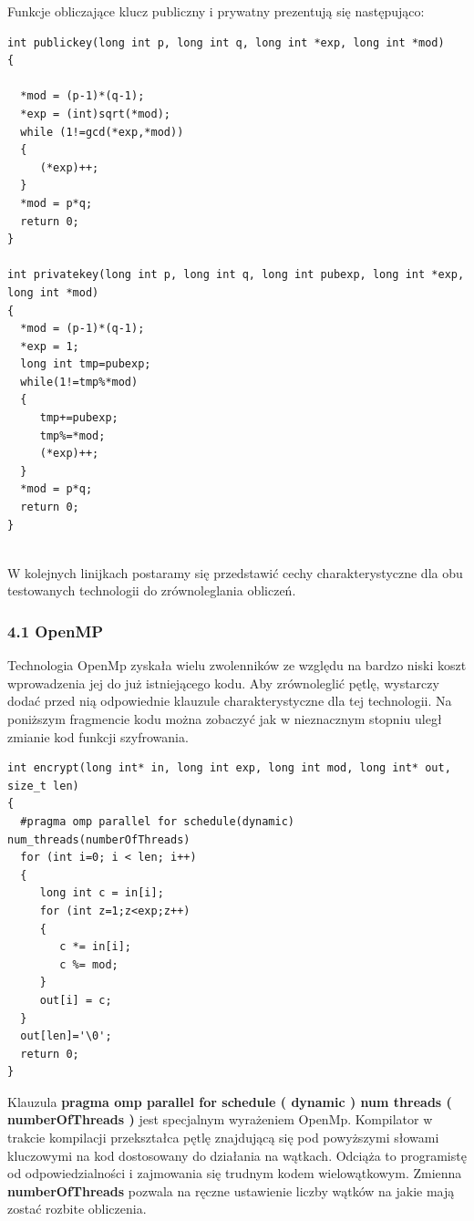 \documentclass[a4paper,12pt]{article}
\begin{document}
Funkcje obliczające klucz publiczny i prywatny prezentują się następująco:
\begin{lstlisting}
int publickey(long int p, long int q, long int *exp, long int *mod)
{

  *mod = (p-1)*(q-1);
  *exp = (int)sqrt(*mod);
  while (1!=gcd(*exp,*mod)) 
  {
     (*exp)++;
  }
  *mod = p*q;
  return 0;
}

int privatekey(long int p, long int q, long int pubexp, long int *exp, long int *mod)
{
  *mod = (p-1)*(q-1);
  *exp = 1;
  long int tmp=pubexp;
  while(1!=tmp%*mod)
  {
     tmp+=pubexp;
     tmp%=*mod;
     (*exp)++;
  }
  *mod = p*q;
  return 0;
}


\end{lstlisting}
W kolejnych linijkach postaramy się przedstawić cechy charakterystyczne dla obu testowanych technologii do zrównoleglania obliczeń.

\subsubsection*{4.1 OpenMP}

Technologia OpenMp zyskała wielu zwolenników ze względu na bardzo niski koszt wprowadzenia jej do już istniejącego kodu. Aby zrównoleglić pętlę, wystarczy dodać przed nią odpowiednie klauzule charakterystyczne dla tej technologii. Na poniższym fragmencie kodu można zobaczyć jak w nieznacznym stopniu uległ zmianie kod funkcji szyfrowania.


\begin{lstlisting}
int encrypt(long int* in, long int exp, long int mod, long int* out, size_t len)
{
  #pragma omp parallel for schedule(dynamic) num_threads(numberOfThreads)
  for (int i=0; i < len; i++)
  {
     long int c = in[i];
     for (int z=1;z<exp;z++)
     {
        c *= in[i];
        c %= mod;
     }
     out[i] = c;
  }
  out[len]='\0';
  return 0;
}

\end{lstlisting}

Klauzula \textbf{pragma omp parallel for schedule ( dynamic ) num threads ( numberOfThreads )} jest specjalnym wyrażeniem OpenMp. Kompilator w trakcie kompilacji przekształca pętlę znajdującą się pod powyższymi słowami kluczowymi na kod dostosowany do działania na wątkach. Odciąża to programistę od odpowiedzialności i zajmowania się trudnym kodem wielowątkowym. Zmienna \textbf{numberOfThreads} pozwala na ręczne ustawienie liczby wątków na jakie mają zostać rozbite obliczenia. 
\end{document}
